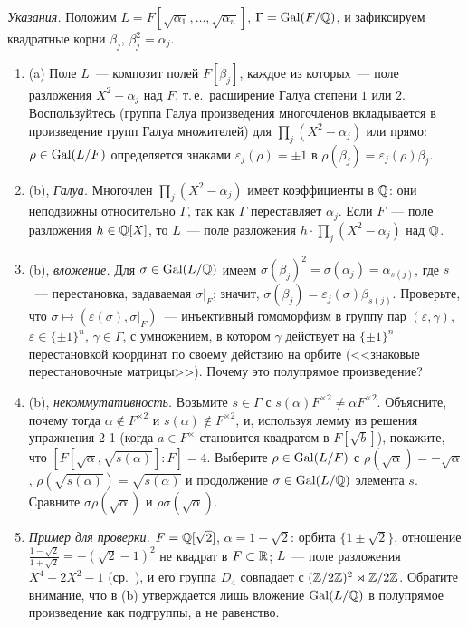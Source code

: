 \noindent\emph{Указания.} Положим $L=F[\sqrt{\alpha_1},\dots,\sqrt{\alpha_n}]$, $\Gamma=\operatorname{Gal}(F/\mathbb Q)$, и зафиксируем
квадратные корни $\beta_j$, $\beta_j^2=\alpha_j$.
\begin{enumerate}[leftmargin=*]
\item (a) Поле $L$~--- композит полей $F[\beta_j]$, каждое из которых~--- поле разложения $X^2-\alpha_j$ над $F$, т.\,е.\ расширение
Галуа степени $1$ или $2$. Воспользуйтесь  (группа Галуа произведения многочленов вкладывается в произведение
групп Галуа множителей) для $\prod_j(X^2-\alpha_j)$ или прямо: $\rho\in\operatorname{Gal}(L/F)$ определяется знаками $\varepsilon_j(\rho)=\pm1$
в $\rho(\beta_j)=\varepsilon_j(\rho)\beta_j$.
\item (b), \emph{Галуа.} Многочлен $\prod_j(X^2-\alpha_j)$ имеет коэффициенты в $\mathbb Q$: они неподвижны относительно $\Gamma$, так
как $\Gamma$ переставляет $\alpha_j$. Если $F$~--- поле разложения $h\in\mathbb Q[X]$, то $L$~--- поле разложения
$h\cdot\prod_j(X^2-\alpha_j)$ над $\mathbb Q$.
\item (b), \emph{вложение.} Для $\sigma\in\operatorname{Gal}(L/\mathbb Q)$ имеем $\sigma(\beta_j)^2=\sigma(\alpha_j)=\alpha_{s(j)}$, где $s$~---
перестановка, задаваемая $\sigma|_F$; значит, $\sigma(\beta_j)=\varepsilon_j(\sigma)\beta_{s(j)}$. Проверьте, что
$\sigma\mapsto(\varepsilon(\sigma),\sigma|_F)$~--- инъективный гомоморфизм в группу пар $(\varepsilon,\gamma)$,
$\varepsilon\in\{\pm1\}^n$, $\gamma\in\Gamma$, с умножением, в котором $\gamma$ действует на $\{\pm1\}^n$ перестановкой
координат по своему действию на орбите (<<знаковые перестановочные матрицы>>). Почему это полупрямое произведение?
\item (b), \emph{некоммутативность.} Возьмите $s\in\Gamma$ с $s(\alpha)F^{\times2}\ne\alpha F^{\times2}$. Объясните, почему тогда
$\alpha\notin F^{\times2}$ и $s(\alpha)\notin F^{\times2}$, и, используя лемму из решения упражнения 2-1 (когда $a\in F^\times$
становится квадратом в $F[\sqrt b]$), покажите, что $[F[\sqrt\alpha,\sqrt{s(\alpha)}]:F]=4$. Выберите
$\rho\in\operatorname{Gal}(L/F)$ с $\rho(\sqrt\alpha)=-\sqrt\alpha$, $\rho(\sqrt{s(\alpha)})=\sqrt{s(\alpha)}$ и продолжение $\sigma\in\operatorname{Gal}(L/\mathbb Q)$
элемента $s$. Сравните $\sigma\rho(\sqrt\alpha)$ и $\rho\sigma(\sqrt\alpha)$.
\item \emph{Пример для проверки.} $F=\mathbb Q[\sqrt2]$, $\alpha=1+\sqrt2$: орбита $\{1\pm\sqrt2\}$, отношение
$\frac{1-\sqrt2}{1+\sqrt2}=-(\sqrt2-1)^2$ не квадрат в $F\subset\mathbb R$; $L$~--- поле разложения $X^4-2X^2-1$ (ср.\ ), и его
группа $D_4$ совпадает с $(\mathbb Z/2\mathbb Z)^2\rtimes\mathbb Z/2\mathbb Z$. Обратите внимание, что в (b) утверждается лишь вложение $\operatorname{Gal}(L/\mathbb Q)$ в полупрямое произведение как подгруппы, а не
равенство.
\end{enumerate}
